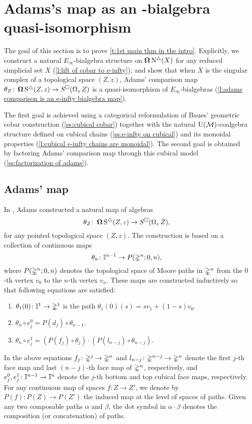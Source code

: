 
\section{Adams's map as an \pdfEinfty-bialgebra quasi-isomorphism} \label{s:theorem1}

The goal of this section is to prove \cref{t:1st main thm in the intro}.
Explicitly, we construct a natural $E_{\infty}$-bialgebra structure on $\operatorname{\mathbf{\Omega}} \operatorname{N^{\triangle}}(X)$ for any reduced simplicial set $X$ (\cref{l:lift of cobar to e-infty}); and show that when $X$ is the singular complex of a topological space $(Z, z)$, Adams' comparison map $\theta_Z \colon \operatorname{\mathbf{\Omega}} \operatorname{S^{\triangle}}(Z, z) \to S^{\square}(\operatorname{\Omega}_z Z)$ is a quasi-isomorphism of $E_\infty$-bialgebras (\cref{l:adams comparison is an e-infty bialgebra map}).

The first goal is achieved using a categorical reformulation of Baues' geometric cobar construction (\cref{ss:cubical cobar}) together with the natural ${\operatorname{U}(\mathcal{M})}$-coalgebra structure defined on cubical chains (\cref{ss:e-infty on cubical}) and its monoidal properties (\cref{l:cubical e-infty chains are monoidal}).
The second goal is obtained by factoring Adams' comparison map through this cubical model (\cref{ss:factorization of adams}).

\subsection{Adams' map}\label{adamsmaps}

In \cite{adams1956cobar}, Adams constructed a natural map of algebras
\begin{equation} \label{e:adams map 2}
\theta_Z \colon \operatorname{\mathbf{\Omega}} \operatorname{S^{\triangle}}(Z, z) \to S^{\square}(\operatorname{\Omega}_z Z),
\end{equation}
for any pointed topological space $(Z, z)$.
The construction is based on a collection of continuous maps
\[
\theta_n \colon \mathbb{I}^{n-1} \to P(\mathbb{\Delta}^n;0,n),
\]
where $P(\mathbb{\Delta}^n;0,n)$ denotes the topological space of Moore paths in $\mathbb{\Delta}^n$ from the $0$-th vertex $v_0$ to the $n$-th vertex $v_n$.
These maps are constructed inductively so that following equations are satisfied:
\begin{enumerate}
	\item $\theta_1(0)\colon \mathbb{I}^1 \to \mathbb{\Delta}^1$ is the path $\theta_1(0)(s) = sv_1 +(1-s)v_0$.
	\item $\theta_n \circ e_j^0 = P(d_j) \circ \theta_{n-1}$.
	\item $\theta_n \circ e_j^1 = (P(f_j) \circ \theta_j) \cdot (P(l_{n-j}) \circ \theta_{n-j})$.
\end{enumerate}
In the above equations $f_j\colon \mathbb{\Delta}^j \rightarrow \mathbb{\Delta}^n$ and $l_{n-j}\colon \mathbb{\Delta}^{n-j} \rightarrow \mathbb{\Delta}^n$ denote the first $j$-th face map and last $(n-j)$-th face map of $\mathbb{\Delta}^n$, respectively, and
$e_j^0,e_j^1\colon \mathbb{I}^{n-1} \rightarrow \mathbb{I}^{n}$ denote the $j$-th bottom and top cubical face maps, respectively.
For any continuous map of spaces $f \colon Z \to Z'$, we denote by $P(f) \colon P(Z) \to P(Z')$ the induced map at the level of spaces of paths.
Given any two composable paths $\alpha$ and $\beta$, the dot symbol in $\alpha \cdot \beta$ denotes the composition (or concatenation) of paths.

